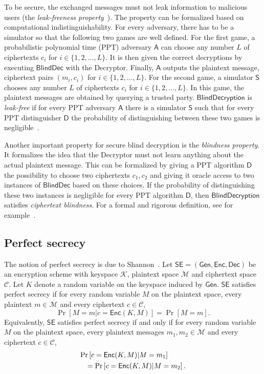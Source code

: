 \documentclass[10pt,journal]{IEEEtran}
\newcommand{\alg}[1]{\mathsf{#1}}
\newcommand{\sch}[1]{\mathsf{#1}}
\begin{document}
 To be secure,
the exchanged messages
must not leak information to malicious users (the \emph{leak-freeness property}~\cite{Green_2007}).
The property can be formalized based on computational indistinguishability.
For every adversary, there has to be a simulator so that the following two games are well defined.
For the first game, a probabilistic polynomial time (PPT) adversary $\alg{A}$ can choose any number $L$ of ciphertexts $c_i$ for $i \in \{1,2,\ldots,L\}$.
It is then given the correct decryptions by executing $\alg{BlindDec}$ with the Decryptor. Finally,
$\alg{A}$ outputs the plaintext message, ciphertext pairs $(m_i,c_i)$ for $i \in \{1,2,\ldots,L\}$.
For the second game,
a simulator $\alg{S}$ chooses any number $L$ of ciphertexts $c_i$ for $i \in \{1,2,\ldots,L\}$.
In this game, the plaintext messages are obtained by querying a trusted party.
$\alg{BlindDecryption}$ is \emph{leak-free} if for every PPT adversary $\alg{A}$ there is a simulator $\alg{S}$
such that for every PPT distinguisher $\alg{D}$ the probability of distinguishing between
these two games is negligible~\cite{Green_2011}.

Another important property for secure blind decryption is the \emph{blindness property}.
It formalizes the idea that the Decryptor must not learn anything
about the actual plaintext message.
This can be formalized
by giving a PPT algorithm $\alg{D}$ the possibility to choose
two ciphertexts $c_1,c_2$ and giving it oracle access
to two instances of $\alg{BlindDec}$ based on these choices. If the probability of distinguishing
these two instances is negligible for every PPT algorithm $\alg{D}$, then 
$\alg{BlindDecryption}$ satisfies \emph{ciphertext blindness}.
For a formal and rigorous definition, see for example~\cite{Green_2011}.



\subsection{Perfect secrecy}

The notion of perfect secrecy is due to Shannon~\cite{Shannon_1949}. Let $\sch{SE} = (\alg{Gen},\alg{Enc},\alg{Dec})$ be an encryption
scheme with keyspace $\mathcal{K}$, plaintext space $\mathcal{M}$ and ciphertext space $\mathcal{C}$.
Let $K$ denote a random variable on the keyspace
induced by $\alg{Gen}$.
$\sch{SE}$
satisfies perfect secrecy if for every random variable $M$
on the plaintext space, every plaintext $m \in \mathcal{M}$ and every
ciphertext $c \in \mathcal{C}$,
\[
\Pr \left[ M = m | c = \alg{Enc}(K, M) \right] = \Pr \left[ M = m \right].
\]
Equivalently, 
$\sch{SE}$
satisfies perfect secrecy if and only if for every random variable $M$
on the plaintext space,
every plaintext messages $m_1,m_2 \in \mathcal{M}$ and every
ciphertext $c \in \mathcal{C}$,
\begin{eqnarray}
\lefteqn{\Pr \left[ c = \alg{Enc}(K, M)| M = m_1 \right]} \nonumber\\
& & = \Pr \left[ c = \alg{Enc}(K, M)| M = m_2 \right]. \nonumber
\end{eqnarray}
\end{document}
